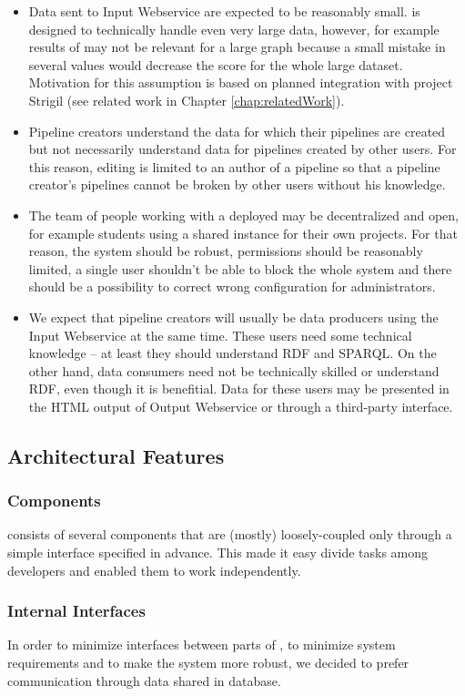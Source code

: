 \begin{itemize}
	\item Data sent to Input Webservice are expected to be reasonably small. \odcs is designed to technically handle even very large data, however, for example results of \QA may not be relevant for a large graph because a small mistake in several values would decrease the \QA score for the whole large dataset. Motivation for this assumption is based on planned integration with project Strigil (see related work in Chapter \ref{chap:relatedWork}).
	\item Pipeline creators understand the data for which their pipelines are created but not necessarily understand data for pipelines created by other users. For this reason, editing is limited to an author of a pipeline so that a pipeline creator's pipelines cannot be broken by other users without his knowledge.
	\item The team of people working with a deployed \odcs may be decentralized and open, for example students using a shared instance for their own projects. For that reason, the system should be robust, permissions should be reasonably limited, a single user shouldn't be able to block the whole system and there should be a possibility to correct wrong configuration for administrators.
	\item We expect that pipeline creators will usually be  data producers  using the Input Webservice at the same time. These users need some technical knowledge -- at least they should understand RDF and SPARQL. On the other hand, data consumers need not be technically skilled or understand RDF, even though it is benefitial. Data for these users may be presented in the HTML output of Output Webservice or through a third-party interface.
\end{itemize}


\subsection{Architectural Features}

\subsubsection{Components}
\odcs consists of several components that are (mostly) loosely-coupled only through a simple interface specified in advance. This made it easy divide tasks among developers and enabled them to work independently.

\subsubsection{Internal Interfaces}
In order to minimize interfaces between parts of \odcs, to minimize system requirements and to make the system more robust, we decided to prefer communication through data shared in database.

